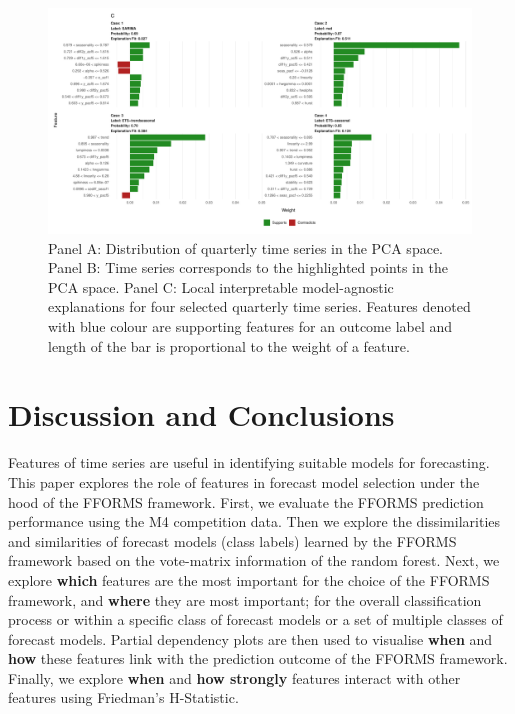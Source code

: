 \documentclass[11pt,a4paper,]{article}
\begin{document}
\begin{figure}[h]

{\centering \includegraphics{figures/quarterlylime2-1} 

}

\caption{Panel A: Distribution of quarterly time series in the PCA space. Panel B: Time series corresponds to the highlighted points in the PCA space. Panel C: Local interpretable model-agnostic explanations for four selected quarterly time series. Features denoted with blue colour are supporting features for an outcome label and length of the bar is proportional to the weight of a feature.}\label{fig:quarterlylime2}
\end{figure}

\hypertarget{conclusions}{%
\section{Discussion and Conclusions}\label{conclusions}}

Features of time series are useful in identifying suitable models for forecasting. This paper explores the role of features in forecast model selection under the hood of the FFORMS framework. First, we evaluate the FFORMS prediction performance using the M4 competition data. Then we explore the dissimilarities and similarities of forecast models (class labels) learned by the FFORMS framework based on the vote-matrix information of the random forest. Next, we explore \textbf{which} features are the most important for the choice of the FFORMS framework, and \textbf{where} they are most important; for the overall classification process or within a specific class of forecast models or a set of multiple classes of forecast models. Partial dependency plots are then used to visualise \textbf{when} and \textbf{how} these features link with the prediction outcome of the FFORMS framework. Finally, we explore \textbf{when} and \textbf{how strongly} features interact with other features using Friedman's H-Statistic.
\end{document}
